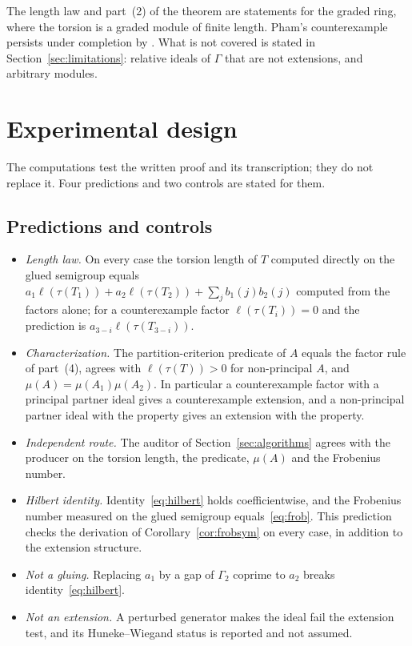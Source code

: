 \documentclass[11pt]{article}
\theoremstyle{definition}
\theoremstyle{remark}
\newcommand{\tor}{\tau}
\newcommand{\len}{\ell}
\begin{document}
The length law and part~(2) of the theorem are statements for the graded ring, where the torsion is a graded module of finite
length. Pham's counterexample persists under completion by \cite{Pham2026}. What is not covered is stated in
Section~\ref{sec:limitations}: relative ideals of $\Gamma$ that are not extensions, and arbitrary modules.

\section{Experimental design}\label{sec:design}

The computations test the written proof and its transcription; they do not replace it. Four predictions and two controls are
stated for them.

\subsection{Predictions and controls}

\begin{itemize}
\item[P1] \emph{Length law.} On every case the torsion length of $T$ computed directly on the glued semigroup equals
$a_1\len(\tor(T_1))+a_2\len(\tor(T_2))+\sum_jb_1(j)b_2(j)$ computed from the factors alone; for a counterexample factor
$\len(\tor(T_i))=0$ and the prediction is $a_{3-i}\len(\tor(T_{3-i}))$.
\item[P2] \emph{Characterization.} The partition-criterion predicate of $A$ equals the factor rule of part~(4), agrees with
$\len(\tor(T))>0$ for non-principal $A$, and $\mu(A)=\mu(A_1)\mu(A_2)$. In particular a counterexample factor with a
principal partner ideal gives a counterexample extension, and a non-principal partner ideal with the property gives an
extension with the property.
\item[P3] \emph{Independent route.} The auditor of Section~\ref{sec:algorithms} agrees with the producer on the torsion
length, the predicate, $\mu(A)$ and the Frobenius number.
\item[P4] \emph{Hilbert identity.} Identity~\eqref{eq:hilbert} holds coefficientwise, and the Frobenius number measured on the glued semigroup
equals~\eqref{eq:frob}. This prediction checks the derivation of Corollary~\ref{cor:frobsym} on every case, in addition to the extension structure.
\item[C1] \emph{Not a gluing.} Replacing $a_1$ by a gap of $\Gamma_2$ coprime to $a_2$ breaks identity~\eqref{eq:hilbert}.
\item[C2] \emph{Not an extension.} A perturbed generator makes the ideal fail the extension test, and its Huneke--Wiegand
status is reported and not assumed.
\end{itemize}
\end{document}
